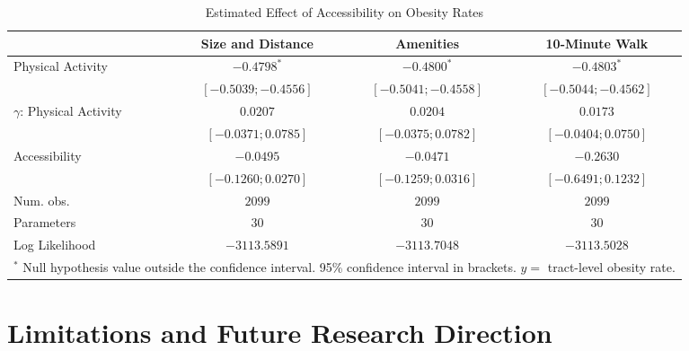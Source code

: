 \documentclass[Crown,sageh.bst]{sagej}
\begin{document}
\begin{table*}
\caption{Estimated Effect of Accessibility on Obesity Rates}
\label{tab:obesity-models}

\begin{tabular}{l c c c}
\toprule
 & Size and Distance & Amenities & 10-Minute Walk \\
\midrule
Physical Activity           & $-0.4798^{*}$         & $-0.4800^{*}$         & $-0.4803^{*}$         \\
                            & $ [-0.5039; -0.4556]$ & $ [-0.5041; -0.4558]$ & $ [-0.5044; -0.4562]$ \\
$\gamma$: Physical Activity & $0.0207$              & $0.0204$              & $0.0173$              \\
                            & $ [-0.0371;  0.0785]$ & $ [-0.0375;  0.0782]$ & $ [-0.0404;  0.0750]$ \\
Accessibility               & $-0.0495$             & $-0.0471$             & $-0.2630$             \\
                            & $ [-0.1260;  0.0270]$ & $ [-0.1259;  0.0316]$ & $ [-0.6491;  0.1232]$ \\
\midrule
Num. obs.                   & $2099$                & $2099$                & $2099$                \\
Parameters                  & $30$                  & $30$                  & $30$                  \\
Log Likelihood              & $-3113.5891$          & $-3113.7048$          & $-3113.5028$          \\
\bottomrule
\multicolumn{4}{l}{\scriptsize{$^*$ Null hypothesis value outside the confidence interval. 95\% confidence interval in brackets.  $y = $ tract-level obesity rate.}}
\end{tabular}
\end{table*}

\hypertarget{limitations-and-future-research-direction}{%
\section{Limitations and Future Research
Direction}\label{limitations-and-future-research-direction}}
\end{document}
